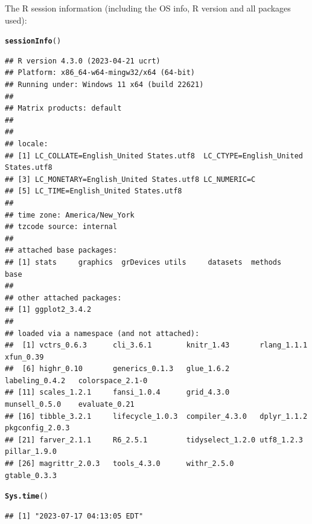 \documentclass{article}\usepackage[]{graphicx}\usepackage[]{xcolor}
\makeatletter
\newcommand{\hlstd}[1]{\textcolor[rgb]{0.345,0.345,0.345}{#1}}%
\newcommand{\hlkwd}[1]{\textcolor[rgb]{0.737,0.353,0.396}{\textbf{#1}}}%
\newenvironment{kframe}{%
 \def\at@end@of@kframe{}%
 \ifinner\ifhmode%
  \def\at@end@of@kframe{\end{minipage}}%
  \begin{minipage}{\columnwidth}%
 \fi\fi%
 \def\FrameCommand##1{\hskip\@totalleftmargin \hskip-\fboxsep
 \colorbox{shadecolor}{##1}\hskip-\fboxsep
     \hskip-\linewidth \hskip-\@totalleftmargin \hskip\columnwidth}%
 \MakeFramed {\advance\hsize-\width
   \@totalleftmargin\z@ \linewidth\hsize
   \@setminipage}}%
 {\par\unskip\endMakeFramed%
 \at@end@of@kframe}
\newenvironment{knitrout}{}{} %
\makeatother
\begin{document}
The R session information (including the OS info, R version and all
packages used):

\begin{knitrout}
\color{fgcolor}\begin{kframe}
\begin{alltt}
\hlkwd{sessionInfo}\hlstd{()}
\end{alltt}
\begin{verbatim}
## R version 4.3.0 (2023-04-21 ucrt)
## Platform: x86_64-w64-mingw32/x64 (64-bit)
## Running under: Windows 11 x64 (build 22621)
## 
## Matrix products: default
## 
## 
## locale:
## [1] LC_COLLATE=English_United States.utf8  LC_CTYPE=English_United States.utf8   
## [3] LC_MONETARY=English_United States.utf8 LC_NUMERIC=C                          
## [5] LC_TIME=English_United States.utf8    
## 
## time zone: America/New_York
## tzcode source: internal
## 
## attached base packages:
## [1] stats     graphics  grDevices utils     datasets  methods   base     
## 
## other attached packages:
## [1] ggplot2_3.4.2
## 
## loaded via a namespace (and not attached):
##  [1] vctrs_0.6.3      cli_3.6.1        knitr_1.43       rlang_1.1.1      xfun_0.39       
##  [6] highr_0.10       generics_0.1.3   glue_1.6.2       labeling_0.4.2   colorspace_2.1-0
## [11] scales_1.2.1     fansi_1.0.4      grid_4.3.0       munsell_0.5.0    evaluate_0.21   
## [16] tibble_3.2.1     lifecycle_1.0.3  compiler_4.3.0   dplyr_1.1.2      pkgconfig_2.0.3 
## [21] farver_2.1.1     R6_2.5.1         tidyselect_1.2.0 utf8_1.2.3       pillar_1.9.0    
## [26] magrittr_2.0.3   tools_4.3.0      withr_2.5.0      gtable_0.3.3
\end{verbatim}
\begin{alltt}
\hlkwd{Sys.time}\hlstd{()}
\end{alltt}
\begin{verbatim}
## [1] "2023-07-17 04:13:05 EDT"
\end{verbatim}
\end{kframe}
\end{knitrout}
\end{document}
